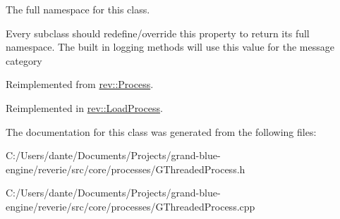 The full namespace for this class. 

Every subclass should redefine/override this property to return its full namespace. The built in logging methods will use this value for the message category 

Reimplemented from \mbox{\hyperlink{classrev_1_1_process_a7f5a6ab8af65aec3132f6a072b9fcb87}{rev\+::\+Process}}.



Reimplemented in \mbox{\hyperlink{classrev_1_1_load_process_aadfe0ec547dbda51e60517691617e88b}{rev\+::\+Load\+Process}}.



The documentation for this class was generated from the following files\+:\begin{DoxyCompactItemize}
\item 
C\+:/\+Users/dante/\+Documents/\+Projects/grand-\/blue-\/engine/reverie/src/core/processes/G\+Threaded\+Process.\+h\item 
C\+:/\+Users/dante/\+Documents/\+Projects/grand-\/blue-\/engine/reverie/src/core/processes/G\+Threaded\+Process.\+cpp\end{DoxyCompactItemize}
